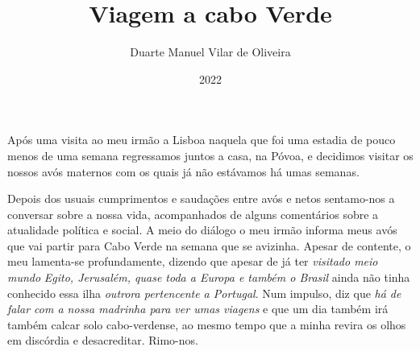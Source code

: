 \documentclass{article}
\title{Viagem a cabo Verde}
\author{Duarte Manuel Vilar de Oliveira }
\date{2022}
\begin{document}
\maketitle

Após uma visita ao meu irmão a Lisboa \- naquela que foi uma estadia de pouco menos de uma semana regressamos juntos a casa, na Póvoa, e decidimos visitar os nossos avós maternos com os quais já não estávamos há umas semanas.
 
Depois dos usuais cumprimentos e saudações entre avós e netos sentamo-nos a conversar sobre a nossa vida, acompanhados de alguns comentários sobre a atualidade política e social.
A meio do diálogo o meu irmão informa meus avós que vai partir para Cabo Verde na semana que se avizinha.
Apesar de contente, o meu lamenta-se profundamente, dizendo que apesar de já ter \textit{visitado meio mundo} \- \textit{Egito, Jerusalém, quase toda a Europa e também o Brasil} \- ainda não tinha conhecido essa ilha \textit{outrora pertencente a Portugal}.
Num impulso, diz que \textit{há de falar com a nossa madrinha para ver umas viagens} e que um dia também irá também calcar solo cabo-verdense, ao mesmo tempo que a minha revira os olhos em discórdia e desacreditar. Rimo-nos.

\printindex
\end{document}
